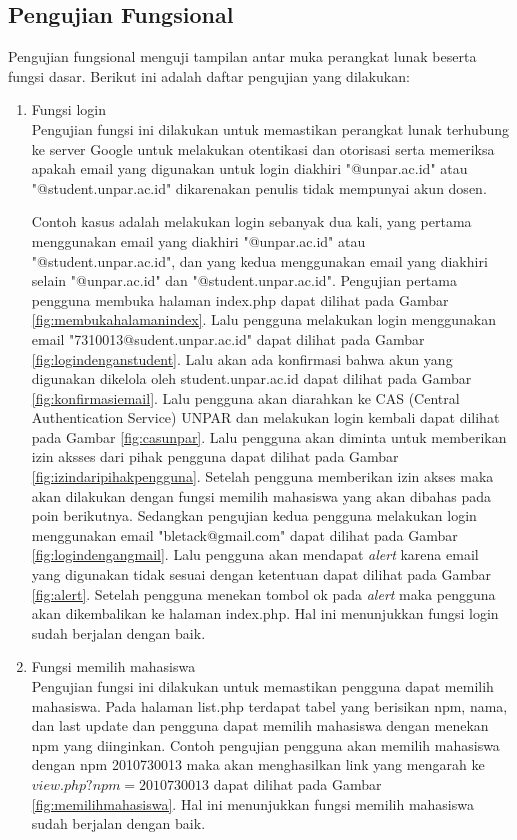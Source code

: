 \subsection{Pengujian Fungsional}
\label{sec:pengujianfungsional}
Pengujian fungsional menguji tampilan antar muka perangkat lunak beserta fungsi dasar. Berikut ini adalah daftar pengujian yang dilakukan:
\begin{enumerate}[(1)]
\item Fungsi login\\
    Pengujian fungsi ini dilakukan untuk memastikan perangkat lunak terhubung ke server Google untuk melakukan otentikasi dan otorisasi serta memeriksa apakah email yang digunakan untuk login diakhiri "@unpar.ac.id" atau "@student.unpar.ac.id" dikarenakan penulis tidak mempunyai akun dosen.
    
    Contoh kasus adalah melakukan login sebanyak dua kali, yang pertama menggunakan email yang diakhiri "@unpar.ac.id" atau "@student.unpar.ac.id", dan yang kedua menggunakan email yang diakhiri selain "@unpar.ac.id" dan "@student.unpar.ac.id". Pengujian pertama pengguna membuka halaman index.php dapat dilihat pada Gambar \ref{fig:membukahalamanindex}. Lalu pengguna melakukan login menggunakan email "7310013@sudent.unpar.ac.id" dapat dilihat pada Gambar \ref{fig:logindenganstudent}. Lalu akan ada konfirmasi bahwa akun yang digunakan dikelola oleh student.unpar.ac.id dapat dilihat pada Gambar \ref{fig:konfirmasiemail}. Lalu pengguna akan diarahkan ke CAS (Central Authentication Service) UNPAR dan melakukan login kembali dapat dilihat pada Gambar \ref{fig:casunpar}. Lalu pengguna akan diminta untuk memberikan izin aksses dari pihak pengguna dapat dilihat pada Gambar \ref{fig:izindaripihakpengguna}. Setelah pengguna memberikan izin akses maka akan dilakukan dengan fungsi memilih mahasiswa yang akan dibahas pada poin berikutnya. Sedangkan pengujian kedua pengguna melakukan login menggunakan email "bletack@gmail.com" dapat dilihat pada Gambar \ref{fig:logindengangmail}. Lalu pengguna akan mendapat {\it alert} karena email yang digunakan tidak sesuai dengan ketentuan dapat dilihat pada Gambar \ref{fig:alert}. Setelah pengguna menekan tombol ok pada {\it alert} maka pengguna akan dikembalikan ke halaman index.php. Hal ini menunjukkan fungsi login sudah berjalan dengan baik.

\item Fungsi memilih mahasiswa\\
	Pengujian fungsi ini dilakukan untuk memastikan pengguna dapat memilih mahasiswa. Pada halaman list.php terdapat tabel yang berisikan npm, nama, dan last update dan pengguna dapat memilih mahasiswa dengan menekan npm yang diinginkan. Contoh pengujian pengguna akan memilih mahasiswa dengan npm 2010730013 maka akan menghasilkan link yang mengarah ke $view.php?npm=2010730013$ dapat dilihat pada Gambar \ref{fig:memilihmahasiswa}. Hal ini menunjukkan fungsi memilih mahasiswa sudah berjalan dengan baik.
	

\end{enumerate}
